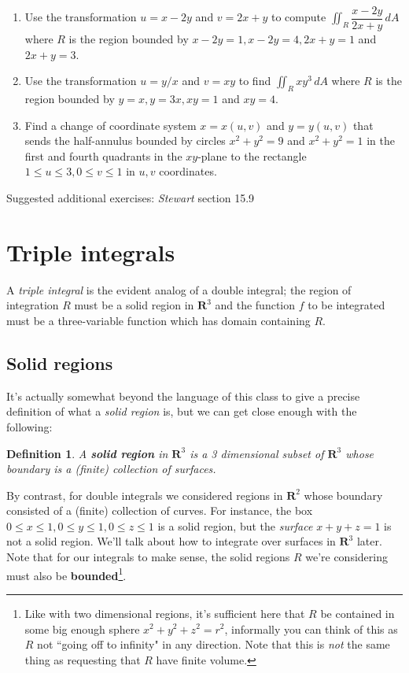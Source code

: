 \documentclass[12pt]{article}
\numberwithin{equation}{subsection}
\numberwithin{figure}{subsection}
\newtheorem{defn}[subsection]{Definition}
\theoremstyle{note}
\begin{document}
{\begin{enumerate}[label=\arabic*.]
\item Use the transformation $u=x-2y$ and $v=2x+y$ to compute $\displaystyle \iint_R \dfrac{x-2y}{2x+y}\,dA$ where $R$ is the region bounded by $x-2y=1, x-2y=4, 2x+y=1$ and $2x+y=3$.

\item  Use the transformation $u=y/x$ and $v=xy$ to find $\displaystyle \iint_R xy^3\,dA$ where $R$ is the region bounded by $y=x, y=3x, xy=1$ and $xy=4$.

\item  Find a change of coordinate system $x=x(u,v)$ and $y=y(u,v)$ that sends the half-annulus bounded by circles $x^2+y^2=9$ and $x^2+y^2=1$ in the first and fourth quadrants in the $xy$-plane to the rectangle $1\leq u \leq 3, 0\leq v\leq 1$ in $u,v$ coordinates.
\end{enumerate}
Suggested additional exercises: \textit{Stewart} section 15.9

\section{Triple integrals}



A \textit{triple integral} is the evident analog of a double integral; the region of integration $R$ must be a solid region in $\mathbf{R}^3$ and the function $f$ to be integrated must be a three-variable function which has domain containing $R$. 

\subsection{Solid regions}
It's actually somewhat beyond the language of this class to give a precise definition of what a \textit{solid region} is, but we can get close enough with the following: 

\begin{defn} \label{def-solid-region} A \textbf{solid region} in $\mathbf{R}^3$ is a 3 dimensional subset of $\mathbf{R}^3$ whose \textit{boundary} is a (finite) collection of surfaces.\end{defn}

By contrast, for double integrals we considered regions in $\mathbf{R}^2$ whose boundary consisted of a (finite) collection of curves. For instance, the box $0\leq x\leq 1, 0\leq y\leq 1, 0\leq z\leq 1$ is a solid region, but the \textit{surface} $x+y+z=1$ is not a solid region. We'll talk about how to integrate over surfaces in $\mathbf{R}^3$ later. 
Note that for our integrals to make sense, the solid regions $R$ we're considering must also be \textbf{bounded}\footnote{Like with two dimensional regions, it's sufficient here that $R$ be contained in some big enough sphere $x^2+y^2+z^2=r^2$, informally you can think of this as $R$ not ``going off to infinity" in any direction. Note that this is \textit{not} the same thing as requesting that $R$ have finite volume.}. 
	
}
\end{document}
